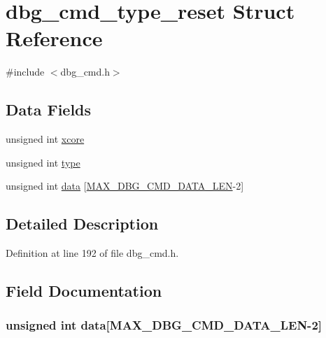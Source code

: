 \hypertarget{structdbg__cmd__type__reset}{\section{dbg\-\_\-cmd\-\_\-type\-\_\-reset Struct Reference}
\label{structdbg__cmd__type__reset}
}


{\ttfamily \#include $<$dbg\-\_\-cmd.\-h$>$}

\subsection*{Data Fields}
\begin{DoxyCompactItemize}
\item 
unsigned int \hyperlink{structdbg__cmd__type__reset_a78357326dd562d441c3c73f5676ac638}{xcore}
\item 
unsigned int \hyperlink{structdbg__cmd__type__reset_a4bfea42429249a1f65204f0c0f34704a}{type}
\item 
unsigned int \hyperlink{structdbg__cmd__type__reset_a5473cf078c6de9b3423378fccee9391a}{data} \mbox{[}\hyperlink{dbg__cmd_8h_a4552ec15033c8a68870cdf80eda5470c}{M\-A\-X\-\_\-\-D\-B\-G\-\_\-\-C\-M\-D\-\_\-\-D\-A\-T\-A\-\_\-\-L\-E\-N}-\/2\mbox{]}
\end{DoxyCompactItemize}


\subsection{Detailed Description}


Definition at line 192 of file dbg\-\_\-cmd.\-h.



\subsection{Field Documentation}
\hypertarget{structdbg__cmd__type__reset_a5473cf078c6de9b3423378fccee9391a}{
\subsubsection[{data}]{\setlength{\rightskip}{0pt plus 5cm}unsigned int data\mbox{[}{\bf M\-A\-X\-\_\-\-D\-B\-G\-\_\-\-C\-M\-D\-\_\-\-D\-A\-T\-A\-\_\-\-L\-E\-N}-\/2\mbox{]}}}\label{structdbg__cmd__type__reset_a5473cf078c6de9b3423378fccee9391a}


